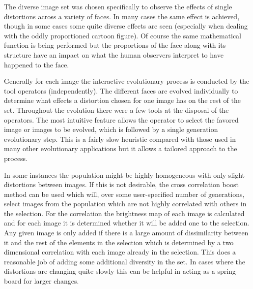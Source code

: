 The diverse image set was chosen specifically to observe the effects of single distortions across a variety of faces. In many cases the same effect is achieved, though in some cases some quite diverse effects are seen (especially when dealing with the oddly proportioned cartoon figure). Of course the same mathematical function is being performed but the proportions of the face along with its structure have an impact on what the human observers interpret to have happened to the face.

Generally for each image the interactive evolutionary process is conducted by the tool operators (independently). The different faces are evolved individually to determine what effects a distortion chosen for one image has on the rest of the set. Throughout the evolution there were a few tools at the disposal of the operators. The most intuitive feature allows the operator to select the favored image or images to be evolved, which is followed by a single generation evolutionary step. This is a fairly slow heuristic compared with those used in many other evolutionary applications but it allows a tailored approach to the process.

In some instances the population might be highly homogeneous with only slight distortions between images. If this is not desirable, the cross correlation boost method can be used which will, over some user-specified number of generations, select images from the population which are not highly correlated with others in the selection. For the correlation the brightness map of each image is calculated and for each image it is determined whether it will be added one to the selection. Any given image is only added if there is a large amount of dissimilarity between it and the rest of the elements in the selection which is determined by a two dimensional correlation with each image already in the selection. This does a reasonable job of adding some additional diversity in the set. In cases where the distortions are changing quite slowly this can be helpful in acting as a spring-board for larger changes.

